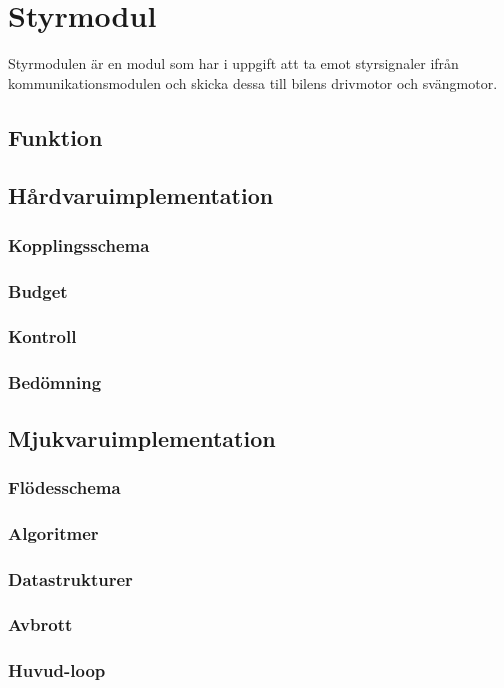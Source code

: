 \documentclass[designspec/spec.tex]{subfiles}
\begin{document}
\section{Styrmodul}
Styrmodulen är en modul som har i uppgift att ta emot styrsignaler ifrån
kommunikationsmodulen och skicka dessa till bilens drivmotor och svängmotor.

\subsection{Funktion}

\subsection{Hårdvaruimplementation}
\subsubsection{Kopplingsschema}

\subsubsection{Budget}

\subsubsection{Kontroll}

\subsubsection{Bedömning}

\subsection{Mjukvaruimplementation}

\subsubsection{Flödesschema}

\subsubsection{Algoritmer}

\subsubsection{Datastrukturer}

\subsubsection{Avbrott}

\subsubsection{Huvud-loop}
\end{document}
